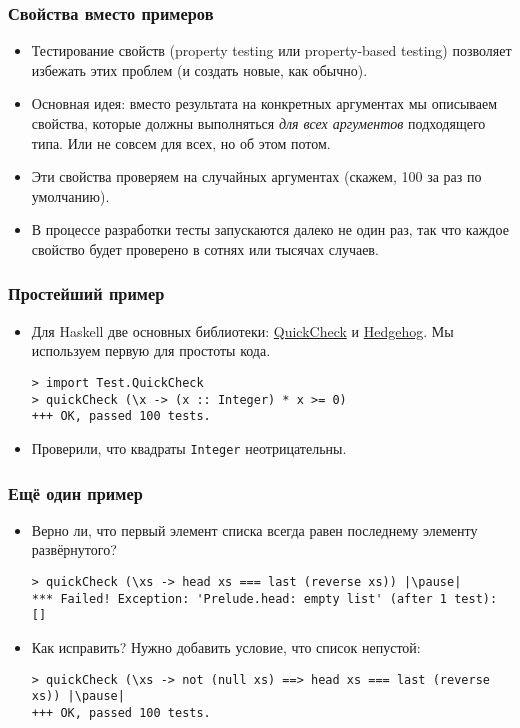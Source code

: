\documentclass[11pt]{beamer}
\begin{document}
\begin{frame}[fragile]
\frametitle{Свойства вместо примеров}
\begin{itemize}
    \item Тестирование свойств (property testing или property-based testing) позволяет избежать этих проблем (и создать новые, как обычно).
    \item Основная идея: вместо результата на конкретных аргументах мы описываем свойства, которые должны выполняться \emph{для всех аргументов} подходящего типа. \pause Или не совсем для всех, но об этом потом.
    \pause
    \item Эти свойства проверяем на случайных аргументах (скажем, 100 за раз по умолчанию).
    \pause
    \item В процессе разработки тесты запускаются далеко не один раз, так что каждое свойство будет проверено в сотнях или тысячах случаев.
\end{itemize}
\end{frame}


\begin{frame}[fragile]
\frametitle{Простейший пример}
\begin{itemize}
    \item Для Haskell две основных библиотеки: \href{http://hackage.haskell.org/package/QuickCheck}{QuickCheck} и \href{https://github.com/hedgehogqa/haskell-hedgehog/}{Hedgehog}. Мы используем первую для простоты кода.
\begin{lstlisting}[basicstyle=\ttfamily\small]
> import Test.QuickCheck
> quickCheck (\x -> (x :: Integer) * x >= 0)
+++ OK, passed 100 tests.
\end{lstlisting}
    \item Проверили, что квадраты \lstinline|Integer| неотрицательны.
\end{itemize}
\end{frame}

\begin{frame}[fragile]
\frametitle{Ещё один пример}
\begin{itemize}
    \item Верно ли, что первый элемент списка всегда равен последнему элементу развёрнутого?
\begin{lstlisting}[escapeinside=||,basicstyle=\ttfamily\small]
> quickCheck (\xs -> head xs === last (reverse xs)) |\pause|
*** Failed! Exception: 'Prelude.head: empty list' (after 1 test):
[]
\end{lstlisting}
    \item Как исправить? \pause Нужно добавить условие, что список непустой:
\begin{lstlisting}[escapeinside=||,basicstyle=\ttfamily\small]
> quickCheck (\xs -> not (null xs) ==> head xs === last (reverse xs)) |\pause|
+++ OK, passed 100 tests.
\end{lstlisting}

\end{itemize}
\end{frame}
\end{document}
